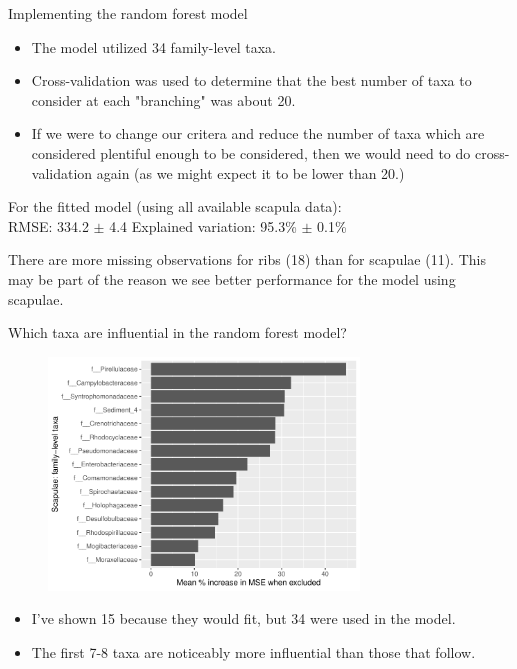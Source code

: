 \documentclass{beamer}
\begin{document}
\begin{frame}{Implementing the random forest model}

\begin{itemize}
\item The model utilized 34 family-level taxa.
\item Cross-validation was used to determine that the best number of taxa to
consider at each "branching" was about 20.
\item If we were to change our critera and reduce the number of taxa which are
considered plentiful enough to be considered, then we would need to do
cross-validation again (as we might expect it to be lower than 20.)
\end{itemize}

\vspace{0.1in}

\noindent For the fitted model (using all available scapula data):\\
\noindent RMSE: 334.2 $\pm$ 4.4 \hspace{0.05in}  Explained variation: 95.3\%
$\pm$ 0.1\%

\vspace{0.1in}

\noindent There are more missing observations for ribs (18) than for scapulae
(11).  This may be part of the reason we see better performance for the model
using scapulae.

\end{frame}



\begin{frame}{Which taxa are influential in the random forest model?}

  \begin{center}
    \begin{figure}
      \includegraphics[width=3.25in]{use_families/w_scapulae/families_scapula_PercIncMSE_barchart}
    \end{figure}
  \end{center}
  \vspace{-0.1in}
  {\scriptsize
  \begin{itemize}
  \item I've shown 15 because they would fit, but 34 were used in the model.
  \item The first 7-8 taxa are noticeably more influential than those that
  follow.
  \end{itemize}
  }

\end{frame}
\end{document}
